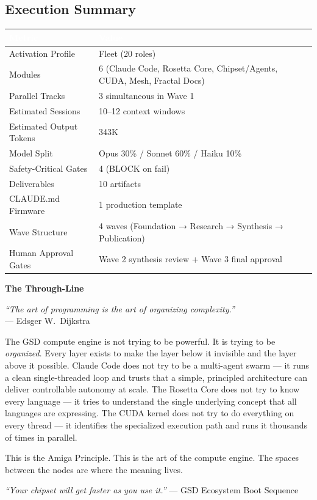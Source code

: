 \documentclass[11pt,letterpaper]{article}
\newcommand{\tableheader}[1]{\textbf{\sffamily\textcolor{white}{#1}}}
\begin{document}
\subsection{Execution Summary}

\begin{center}
\begin{tabularx}{\textwidth}{L{5cm}X}
\toprule
{}
\tableheader{Metric} & \tableheader{Value} \\
\midrule
Activation Profile & Fleet (20 roles) \\
Modules & 6 (Claude Code, Rosetta Core, Chipset/Agents, CUDA, Mesh, Fractal Docs) \\
Parallel Tracks & 3 simultaneous in Wave 1 \\
Estimated Sessions & 10--12 context windows \\
Estimated Output Tokens & 343K \\
Model Split & Opus 30\% / Sonnet 60\% / Haiku 10\% \\
Safety-Critical Gates & 4 (BLOCK on fail) \\
Deliverables & 10 artifacts \\
CLAUDE.md Firmware & 1 production template \\
Wave Structure & 4 waves (Foundation → Research → Synthesis → Publication) \\
Human Approval Gates & Wave 2 synthesis review + Wave 3 final approval \\
\bottomrule
\end{tabularx}
\end{center}

\vspace{1em}

\begin{quotebox}
\textbf{\sffamily\large The Through-Line}

\vspace{0.5em}

\textit{``The art of programming is the art of organizing complexity.''}\\
--- Edsger W.\ Dijkstra

\vspace{0.8em}

The GSD compute engine is not trying to be powerful. It is trying to be \textit{organized}. Every layer exists to make the layer below it invisible and the layer above it possible. Claude Code does not try to be a multi-agent swarm --- it runs a clean single-threaded loop and trusts that a simple, principled architecture can deliver controllable autonomy at scale. The Rosetta Core does not try to know every language --- it tries to understand the single underlying concept that all languages are expressing. The CUDA kernel does not try to do everything on every thread --- it identifies the specialized execution path and runs it thousands of times in parallel.

This is the Amiga Principle. This is the art of the compute engine. The spaces between the nodes are where the meaning lives.

\vspace{0.5em}
\textit{``Your chipset will get faster as you use it.''}
--- GSD Ecosystem Boot Sequence
\end{quotebox}
\end{document}
